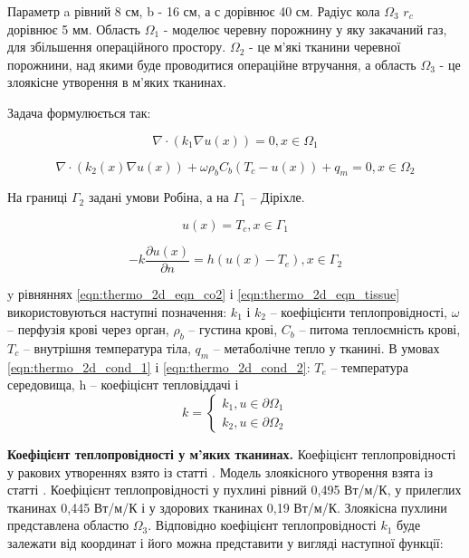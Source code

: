 \noindent Параметр a рівний 8 см, b - 16 см, а с дорівнює 40 см. Радіус кола $\Omega_3$ $r_c$ дорівнює 5 мм. Область 
$\Omega_1$ - моделює черевну порожнину у яку закачаний газ, для збільшення операційного простору. $\Omega_2$ - це 
м'які тканини черевної порожнини, над якими буде проводитися операційне втручання, а область $\Omega_3$ - це злоякісне
утворення в м'яких тканинах.

\noindent Задача формулюється так:

\begin{equation}
    \label{eqn:thermo_2d_eqn_co2}
    \nabla \cdot (k_1 \nabla u(x)) = 0, x \in \Omega_1
\end{equation}

\begin{equation}
    \label{eqn:thermo_2d_eqn_tissue}
    \nabla \cdot (k_2(x) \nabla u(x)) + \omega \rho_b C_b (T_c - u(x)) + q_m  = 0, x \in \Omega_2
\end{equation}

\noindent На границі $\Gamma_2$ задані умови Робіна, а на $\Gamma_1$ -- Діріхле.

\begin{equation}
    \label{eqn:thermo_2d_cond_1}
    u(x) = T_c, x \in \Gamma_1
\end{equation}

\begin{equation}
    \label{eqn:thermo_2d_cond_2}
    -k\dfrac{\partial{u(x)}}{\partial{n}} = h(u(x) - T_e), x \in \Gamma_2
\end{equation}

\noindent y рівняннях \ref{eqn:thermo_2d_eqn_co2} і \ref{eqn:thermo_2d_eqn_tissue} використовуються наступні позначення:
$k_1$ і $k_2$ -- коефіцієнти теплопровідності, $\omega$ -- перфузія крові через орган, $\rho_b$ -- густина крові, $C_b$ 
-- питома теплоємність крові, $T_c$ -- внутрішня температура тіла, $q_m$ -- метаболічне тепло у тканині. В умовах 
\ref{eqn:thermo_2d_cond_1} і \ref{eqn:thermo_2d_cond_2}: $T_e$ -- температура середовища, h -- коефіцієнт тепловіддачі і
$$k=\begin{cases}
k_1, u \in \partial{\Omega_1} \\
k_2, u \in \partial{\Omega_2}
\end{cases}
$$

\textbf{Коефіцієнт теплопровідності у м'яких тканинах.} Коефіцієнт теплопровідності у ракових утвореннях взято із статті 
\cite{lung-tumor-thermal-conductivity}. Модель злоякісного утворення взята із статті \cite{tumor-thermal-model}.
Коефіцієнт теплопровідності у пухлині рівний 0,495 Вт/м/К, у прилеглих тканинах 0,445 Вт/м/К і у здорових тканинах 
0,19 Вт/м/К. Злоякісна пухлини представлена областю $\Omega_3$. Відповідно коефіцієнт теплопровідності $k_1$ буде 
залежати від координат і його можна представити у вигляді наступної функції:

